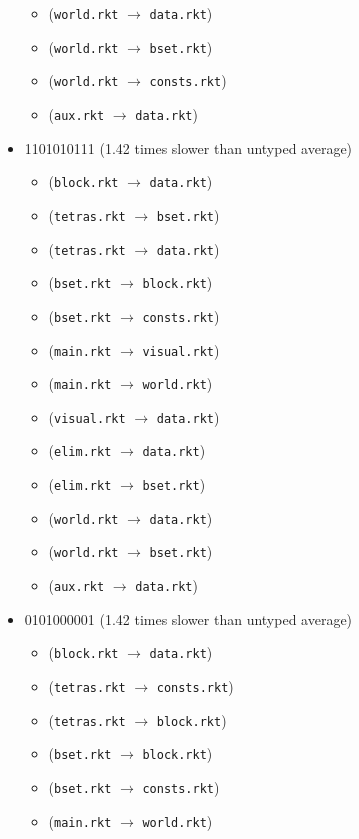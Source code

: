 \documentclass{article}
\newcommand{\mono}[1]{\texttt{#1}}
\begin{document}
\begin{itemize}
\begin{itemize}
  \item (\mono{world.rkt} $\rightarrow$ \mono{data.rkt})
  \item (\mono{world.rkt} $\rightarrow$ \mono{bset.rkt})
  \item (\mono{world.rkt} $\rightarrow$ \mono{consts.rkt})
  \item (\mono{aux.rkt} $\rightarrow$ \mono{data.rkt})
  \end{itemize}
\item 1101010111 (1.42 times slower than untyped average)
  \begin{itemize}
  \item (\mono{block.rkt} $\rightarrow$ \mono{data.rkt})
  \item (\mono{tetras.rkt} $\rightarrow$ \mono{bset.rkt})
  \item (\mono{tetras.rkt} $\rightarrow$ \mono{data.rkt})
  \item (\mono{bset.rkt} $\rightarrow$ \mono{block.rkt})
  \item (\mono{bset.rkt} $\rightarrow$ \mono{consts.rkt})
  \item (\mono{main.rkt} $\rightarrow$ \mono{visual.rkt})
  \item (\mono{main.rkt} $\rightarrow$ \mono{world.rkt})
  \item (\mono{visual.rkt} $\rightarrow$ \mono{data.rkt})
  \item (\mono{elim.rkt} $\rightarrow$ \mono{data.rkt})
  \item (\mono{elim.rkt} $\rightarrow$ \mono{bset.rkt})
  \item (\mono{world.rkt} $\rightarrow$ \mono{data.rkt})
  \item (\mono{world.rkt} $\rightarrow$ \mono{bset.rkt})
  \item (\mono{aux.rkt} $\rightarrow$ \mono{data.rkt})
  \end{itemize}
\item 0101000001 (1.42 times slower than untyped average)
  \begin{itemize}
  \item (\mono{block.rkt} $\rightarrow$ \mono{data.rkt})
  \item (\mono{tetras.rkt} $\rightarrow$ \mono{consts.rkt})
  \item (\mono{tetras.rkt} $\rightarrow$ \mono{block.rkt})
  \item (\mono{bset.rkt} $\rightarrow$ \mono{block.rkt})
  \item (\mono{bset.rkt} $\rightarrow$ \mono{consts.rkt})
  \item (\mono{main.rkt} $\rightarrow$ \mono{world.rkt})

\end{itemize}
\end{itemize}
\end{document}
